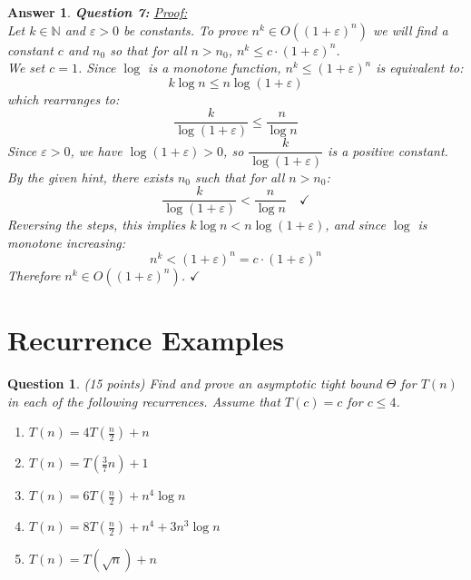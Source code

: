 \documentclass[a4paper]{article}
\theoremstyle{remarksStyle}
\theoremstyle{questionStyle}
\newtheorem{question}{Question}
\theoremstyle{answerStyle}
\newtheorem{answer}{Answer}
\begin{document}
\begin{answer}
\bigskip

\textbf{Question 7:}
\noindent\underline{Proof:}\\
Let $k \in \mathbb{N}$ and $\varepsilon > 0$ be constants.
To prove $n^k \in O((1+\varepsilon)^n)$ we will find a constant $c$ and $n_0$ so that for all $n > n_0$, $n^k \leq c \cdot (1 + \varepsilon)^n$.\\
\medskip
We set $c = 1$. Since $\log$ is a monotone function, $n^k \leq (1+\varepsilon)^n$ is equivalent to:
\[
k\log n \leq n\log(1+\varepsilon)
\]
which rearranges to:
\[
\frac{k}{\log(1+\varepsilon)} \leq \frac{n}{\log n}
\]
Since $\varepsilon > 0$, we have $\log(1+\varepsilon) > 0$, so $\dfrac{k}{\log(1+\varepsilon)}$ is a positive constant.
By the given hint, there exists $n_0$ such that for all $n > n_0$:
\[
\frac{k}{\log(1+\varepsilon)} < \frac{n}{\log n} \quad \checkmark
\]
Reversing the steps, this implies $k\log n < n\log(1+\varepsilon)$, and since $\log$ is monotone increasing:
\[
n^k < (1+\varepsilon)^n = c \cdot (1+\varepsilon)^n
\]
Therefore $n^k \in O((1+\varepsilon)^n)$. $\checkmark$

\end{answer}













\newpage

\section {Recurrence Examples}
\begin{question} (15 points)
Find and prove an asymptotic tight bound $\Theta$ for $T(n)$ in each of the following recurrences. Assume that $T(c) = c$ for $c \le 4$.
\begin{enumerate}
    \item $T(n) = 4T(\frac{n}{2}) + n$
    \item $T(n) = T(\frac{3}{7}n) + 1$
    \item $T(n) = 6T(\frac{n}{2}) + n^4 \log{n}$
    \item $T(n) = 8T(\frac{n}{2}) + n^4 + 3n^3  \log{n} $
    \item $T(n) = T(\sqrt{n}) + n $
\end{enumerate}
\end{question}
\end{document}
